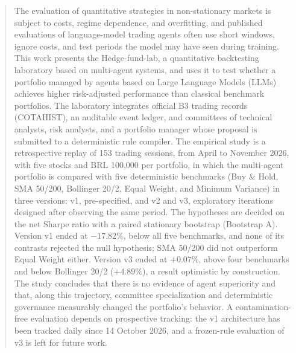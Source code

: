 \documentclass{eic-bcc-tcc}
\begin{document}
\begin{abstract}
The evaluation of quantitative strategies in non-stationary markets is subject to costs, regime dependence, and overfitting, and published evaluations of language-model trading agents often use short windows, ignore costs, and test periods the model may have seen during training. This work presents the Hedge-fund-lab, a quantitative backtesting laboratory based on multi-agent systems, and uses it to test whether a portfolio managed by agents based on Large Language Models (LLMs) achieves higher risk-adjusted performance than classical benchmark portfolios. The laboratory integrates official B3 trading records (COTAHIST), an auditable event ledger, and committees of technical analysts, risk analysts, and a portfolio manager whose proposal is submitted to a deterministic rule compiler. The empirical study is a retrospective replay of 153 trading sessions, from April to November 2026, with five stocks and BRL 100,000 per portfolio, in which the multi-agent portfolio is compared with five deterministic benchmarks (Buy \& Hold, SMA 50/200, Bollinger 20/2, Equal Weight, and Minimum Variance) in three versions: v1, pre-specified, and v2 and v3, exploratory iterations designed after observing the same period. The hypotheses are decided on the net Sharpe ratio with a paired stationary bootstrap (Bootstrap A). Version v1 ended at $-17.82\%$, below all five benchmarks, and none of its contrasts rejected the null hypothesis; SMA 50/200 did not outperform Equal Weight either. Version v3 ended at $+0.07\%$, above four benchmarks and below Bollinger 20/2 ($+4.89\%$), a result optimistic by construction. The study concludes that there is no evidence of agent superiority and that, along this trajectory, committee specialization and deterministic governance measurably changed the portfolio's behavior. A contamination-free evaluation depends on prospective tracking: the v1 architecture has been tracked daily since 14 October 2026, and a frozen-rule evaluation of v3 is left for future work.
\end{abstract}

\listoffigurespage
\listoftablespage
\listofacronymspage
\tableofcontentspage

\mainmatter









\backmatter


\appendix

\end{document}
